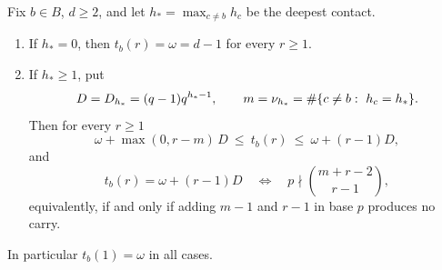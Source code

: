 \begin{theorem}\label{lub:thm:pole}
Fix $b\in B$, $d\ge2$, and let $h_*=\max_{c\ne b}h_c$ be the deepest contact.
\begin{enumerate}[label=\textup{(\alph*)}]
\item If $h_*=0$, then $t_b(r)=\omega=d-1$ for every $r\ge1$.
\item If $h_*\ge1$, put
\[
 D=D_{h_*}=(q-1)q^{h_*-1},\qquad m=\nu_{h_*}=\#\{c\ne b:\ h_c=h_*\}.
\]
Then for every $r\ge1$
\begin{equation}\label{lub:eq:polebound}
 \omega+\max(0,r-m)\,D\ \le\ t_b(r)\ \le\ \omega+(r-1)D,
\end{equation}
and
\begin{equation}\label{lub:eq:carry}
 t_b(r)=\omega+(r-1)D\quad\Longleftrightarrow\quad
 p\nmid\binom{m+r-2}{r-1},
\end{equation}
equivalently, if and only if adding $m-1$ and $r-1$ in base $p$ produces no carry.
\end{enumerate}
In particular $t_b(1)=\omega$ in all cases.
\end{theorem}
